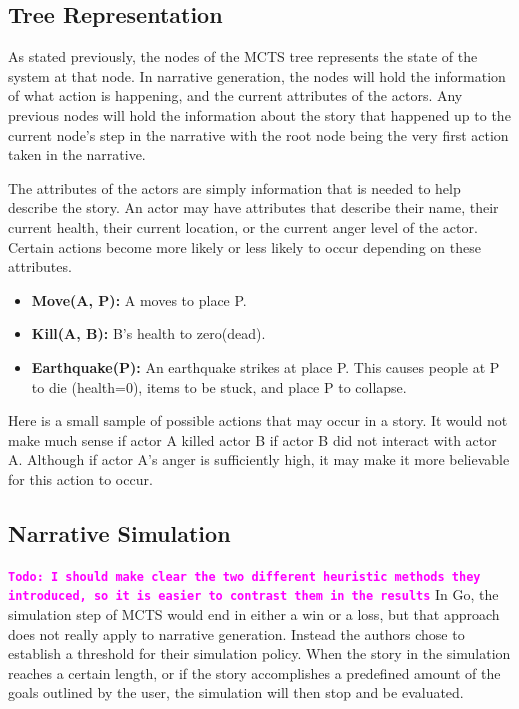 \documentclass{sig-alternate}
\newcommand{\comment}[1]{{\bf \tt  {#1}}}
\newcommand{\todo}[1]{\textcolor{magenta}{\comment{Todo: {#1}}}}
\begin{document}
\subsection{Tree Representation}
As stated previously, the nodes of the MCTS tree represents the state of the system at that node. In narrative generation, the nodes will hold the information of what action is happening, and the current attributes of the actors. Any previous nodes will hold the information about the story that happened up to the current node's step in the narrative with the root node being the very first action taken in the narrative.

The attributes of the actors are simply information that is needed to help describe the story. An actor may have attributes that describe their name, their current health, their current location, or the  current anger level of the actor. Certain actions become more likely or less likely to occur depending on these attributes.

\begin{itemize}
\item \textbf{Move(A, P):} A moves to place P.
\item \textbf{Kill(A, B):} B's health to zero(dead).
\item \textbf{Earthquake(P):} An earthquake strikes at place P. This causes people at P to die (health=0), items to be stuck, and place P to collapse.
\end{itemize}

Here is a small sample of possible actions that may occur in a story. It would not make much sense if actor A killed actor B if actor B did not interact with actor A. Although if actor A's anger is sufficiently high, it may make it more believable for this action to occur\cite{Narrative}.

\subsection{Narrative Simulation}
\todo{I should make clear the two different heuristic methods they introduced, so it is easier to contrast them in the results}
In Go, the simulation step of MCTS would end in either a win or a loss, but that approach does not really apply to narrative generation. Instead the authors chose to establish a threshold for their simulation policy. When the story in the simulation reaches a certain length, or if the story accomplishes a predefined amount of the goals outlined by the user, the simulation will then stop and be evaluated.
\end{document}
